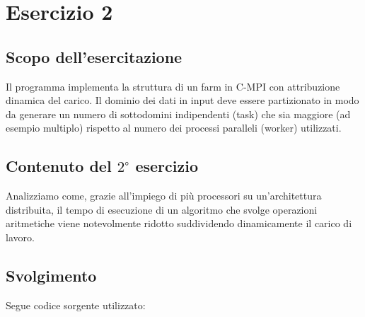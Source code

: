 

%



\chapter*{Esercizio 2}

\section*{Scopo dell'esercitazione}
Il programma implementa la struttura di un farm in C-MPI con attribuzione dinamica del carico. Il dominio dei dati in input deve essere partizionato in modo da generare un numero di sottodomini indipendenti (task) che sia maggiore (ad esempio multiplo) rispetto al numero dei processi paralleli (worker) utilizzati.

\section*{Contenuto del $2^\circ$ esercizio}
Analizziamo come, grazie all'impiego di pi\`u processori su un'architettura distribuita, il tempo di esecuzione di un algoritmo che svolge operazioni aritmetiche viene notevolmente ridotto suddividendo dinamicamente il carico di lavoro.


\section*{Svolgimento}
Segue codice sorgente utilizzato:



